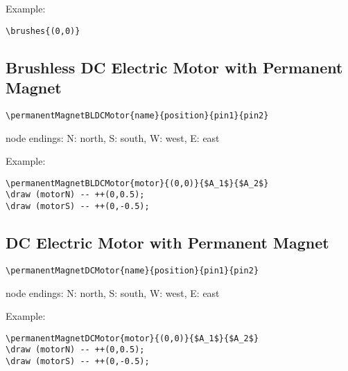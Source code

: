 \documentclass[parskip=full]{scrartcl}
\begin{document}
Example:\\
\begin{minipage}{0.8\textwidth}
\begin{verbatim}
\brushes{(0,0)}
\end{verbatim}
\end{minipage}
\begin{minipage}{0.19\textwidth}
\end{minipage}

\subsection{Brushless DC Electric Motor with Permanent Magnet}

\begin{verbatim}
\permanentMagnetBLDCMotor{name}{position}{pin1}{pin2}
\end{verbatim}
node endings: N: north, S: south, W: west, E: east

Example:\\
\begin{minipage}{0.8\textwidth}
\begin{verbatim}
\permanentMagnetBLDCMotor{motor}{(0,0)}{$A_1$}{$A_2$}
\draw (motorN) -- ++(0,0.5);
\draw (motorS) -- ++(0,-0.5);
\end{verbatim}
\end{minipage}
\begin{minipage}{0.19\textwidth}
\end{minipage}

\subsection{DC Electric Motor with Permanent Magnet}

\begin{verbatim}
\permanentMagnetDCMotor{name}{position}{pin1}{pin2}
\end{verbatim}
node endings: N: north, S: south, W: west, E: east

Example:\\
\begin{minipage}{0.8\textwidth}
\begin{verbatim}
\permanentMagnetDCMotor{motor}{(0,0)}{$A_1$}{$A_2$}
\draw (motorN) -- ++(0,0.5);
\draw (motorS) -- ++(0,-0.5);
\end{verbatim}
\end{minipage}
\begin{minipage}{0.19\textwidth}
\end{minipage}
\end{document}
